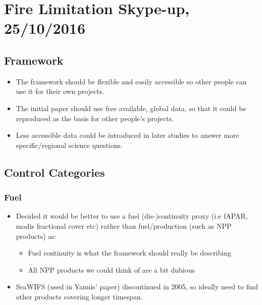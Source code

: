 \section{Fire Limitation Skype-up, 25/10/2016}

\subsection{Framework}

\begin{itemize}
\itemsep1pt\parskip0pt
\item
  The framework should be flexible and easily accessible so other people can use it for their own projects.
\item
  The initial paper should use free available, global data, so that it could be reproduced as the basis for other people's projects.
\item
  Less accessible data could be introduced in later studies to answer more specific/regional science questions.
\end{itemize}

\subsection{Control Categories}

\subsubsection{Fuel}

\begin{itemize}
\itemsep1pt\parskip0pt
\item
  Decided it would be better to use a fuel (dis-)continuity proxy (i.e fAPAR, modis fractional cover etc) rather than fuel/production (such as NPP products) as:

\begin{itemize}
\itemsep1pt\parskip0pt
\item
  Fuel continuity is what the framework should really be describing
\item
  All NPP products we could think of are a bit dubious
\end{itemize}

\end{itemize}



\begin{itemize}
\itemsep1pt\parskip0pt
\item
  SeaWIFS (used in Yannis' paper) discontinued in 2005, so ideally need to find other products covering longer timespan.
\end{itemize}

